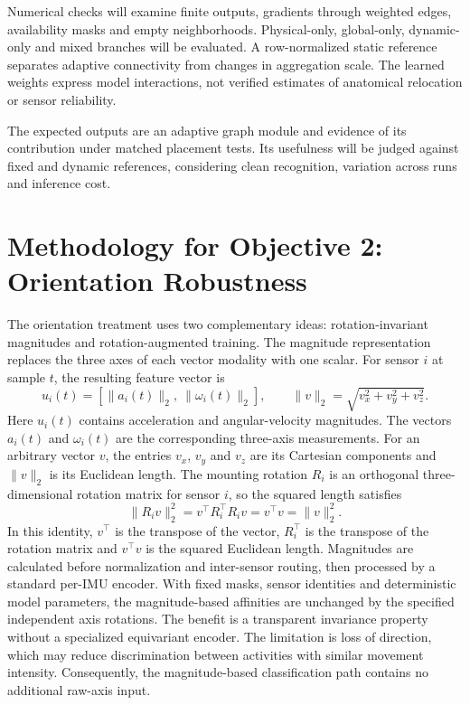 \documentclass[10pt,a4paper,oneside,openany]{report}
\begin{document}
Numerical checks will examine finite outputs, gradients through weighted edges, availability masks and empty neighborhoods. Physical-only, global-only, dynamic-only and mixed branches will be evaluated. A row-normalized static reference separates adaptive connectivity from changes in aggregation scale. The learned weights express model interactions, not verified estimates of anatomical relocation or sensor reliability.

The expected outputs are an adaptive graph module and evidence of its contribution under matched placement tests. Its usefulness will be judged against fixed and dynamic references, considering clean recognition, variation across runs and inference cost.

\section{Methodology for Objective 2: Orientation Robustness}

The orientation treatment uses two complementary ideas: rotation-invariant magnitudes and rotation-augmented training. The magnitude representation replaces the three axes of each vector modality with one scalar. For sensor $i$ at sample $t$, the resulting feature vector is
\[
u_i(t)=\left[\|a_i(t)\|_2,\ \|\omega_i(t)\|_2\right],\qquad
\|v\|_2=\sqrt{v_x^2+v_y^2+v_z^2}.
\]
Here $u_i(t)$ contains acceleration and angular-velocity magnitudes. The vectors $a_i(t)$ and $\omega_i(t)$ are the corresponding three-axis measurements. For an arbitrary vector $v$, the entries $v_x$, $v_y$ and $v_z$ are its Cartesian components and $\|v\|_2$ is its Euclidean length. The mounting rotation $R_i$ is an orthogonal three-dimensional rotation matrix for sensor $i$, so the squared length satisfies
\[
\|R_iv\|_2^2=v^{\top}R_i^{\top}R_iv=v^{\top}v=\|v\|_2^2.
\]
In this identity, $v^{\top}$ is the transpose of the vector, $R_i^{\top}$ is the transpose of the rotation matrix and $v^{\top}v$ is the squared Euclidean length. Magnitudes are calculated before normalization and inter-sensor routing, then processed by a standard per-IMU encoder. With fixed masks, sensor identities and deterministic model parameters, the magnitude-based affinities are unchanged by the specified independent axis rotations. The benefit is a transparent invariance property without a specialized equivariant encoder. The limitation is loss of direction, which may reduce discrimination between activities with similar movement intensity. Consequently, the magnitude-based classification path contains no additional raw-axis input.
\end{document}
